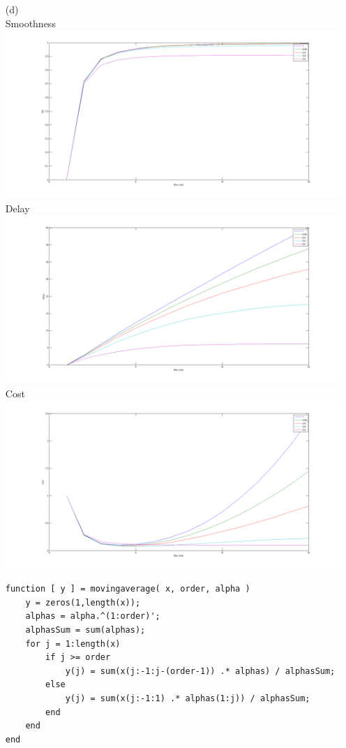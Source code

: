\documentclass{article}
\begin{document}
\begin{enumerate}
\begin{enumerate}
\bigskip

	\item[(d)]  $\:$ \\
		Smoothness\\
		\includegraphics[scale=0.3]{../images/AlphaRS.png}
		Delay\\
		\includegraphics[scale=0.3]{../images/AlphaDelays.png}
		Cost\\
		\includegraphics[scale=0.3]{../images/AlphaCosts.png}

\newpage

\begin{lstlisting}   
function [ y ] = movingaverage( x, order, alpha )
    y = zeros(1,length(x));
    alphas = alpha.^(1:order)';
    alphasSum = sum(alphas);
    for j = 1:length(x)
        if j >= order
            y(j) = sum(x(j:-1:j-(order-1)) .* alphas) / alphasSum;        
        else
            y(j) = sum(x(j:-1:1) .* alphas(1:j)) / alphasSum;
        end   
    end
end


\end{lstlisting}
\end{enumerate}
\end{enumerate}
\end{document}
